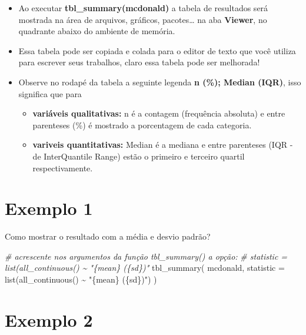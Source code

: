 \documentclass[
]{book}
\newenvironment{Shaded}{\begin{snugshade}}{\end{snugshade}}
\newcommand{\AttributeTok}[1]{\textcolor[rgb]{0.77,0.63,0.00}{#1}}
\newcommand{\CommentTok}[1]{\textcolor[rgb]{0.56,0.35,0.01}{\textit{#1}}}
\newcommand{\FunctionTok}[1]{\textcolor[rgb]{0.00,0.00,0.00}{#1}}
\newcommand{\NormalTok}[1]{#1}
\newcommand{\SpecialCharTok}[1]{\textcolor[rgb]{0.00,0.00,0.00}{#1}}
\newcommand{\StringTok}[1]{\textcolor[rgb]{0.31,0.60,0.02}{#1}}
\begin{document}
\begin{itemize}
\item
  Ao executar \textbf{tbl\_summary(mcdonald)} a tabela de resultados será mostrada na área de arquivos, gráficos, pacotes\ldots{} na aba \textbf{Viewer}, no quadrante abaixo do ambiente de memória.
\item
  Essa tabela pode ser copiada e colada para o editor de texto que você utiliza para escrever seus trabalhos, claro essa tabela pode ser melhorada!
\item
  Observe no rodapé da tabela a seguinte legenda \textbf{n (\%); Median (IQR)}, isso significa que para

  \begin{itemize}
  \item
    \textbf{variáveis qualitativas:} n é a contagem (frequência absoluta) e entre parenteses (\%) é mostrado a porcentagem de cada categoria.
  \item
    \textbf{variveis quantitativas:} Median é a mediana e entre parenteses (IQR - de InterQuantile Range) estão o primeiro e terceiro quartil respectivamente.
  \end{itemize}
\end{itemize}

\hypertarget{exemplo-1-2}{%
\section{Exemplo 1}\label{exemplo-1-2}}

Como mostrar o resultado com a média e desvio padrão?

\begin{Shaded}
\begin{Highlighting}[]
\CommentTok{\# acrescente nos argumentos da função tbl\_summary() a opção:}
\CommentTok{\# statistic = list(all\_continuous() \textasciitilde{} "\{mean\} (\{sd\})"}
\FunctionTok{tbl\_summary}\NormalTok{(}
\NormalTok{            mcdonald, }
            \AttributeTok{statistic =} \FunctionTok{list}\NormalTok{(}\FunctionTok{all\_continuous}\NormalTok{() }\SpecialCharTok{\textasciitilde{}} \StringTok{"\{mean\} (\{sd\})"}\NormalTok{)}
\NormalTok{            )}
\end{Highlighting}
\end{Shaded}

\hypertarget{exemplo-2-2}{%
\section{Exemplo 2}\label{exemplo-2-2}}
\end{document}
